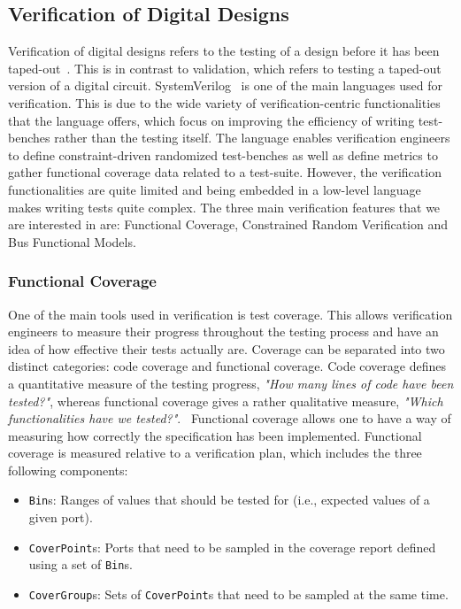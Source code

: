 \documentclass[conference]{IEEEtran}
\begin{document}
\subsection{Verification of Digital Designs}
Verification of digital designs refers to the testing of a design before it has been taped-out~\cite{spear2008systemverilog}. This is in contrast to validation, which refers to testing a taped-out version of a digital circuit. 
SystemVerilog~\cite{SystemVerilog} is one of the main languages used for verification.
This is due to the wide variety of verification-centric functionalities that the language offers, which focus on improving the efficiency of writing test-benches rather than the testing itself.
The language enables verification engineers to define constraint-driven randomized test-benches as well as define metrics to gather functional coverage data related to a test-suite. 
However, the verification functionalities are quite limited and being embedded in a low-level language makes writing tests quite complex. 
The three main verification features that we are interested in are: Functional Coverage, Constrained Random Verification and Bus Functional Models.

\subsubsection{Functional Coverage}
One of the main tools used in verification is test coverage. 
This allows verification engineers to measure their progress throughout the testing process and have an idea of how effective their tests actually are. 
Coverage can be separated into two distinct categories: code coverage and functional coverage. 
Code coverage defines a quantitative measure of the testing progress, \textit{"How many lines of code have been tested?"}, whereas functional coverage gives a rather qualitative measure, \textit{"Which functionalities have we tested?"}.~\cite{spear2008systemverilog}  
Functional coverage allows one to have a way of measuring how correctly the specification has been implemented. Functional coverage is measured relative to a verification plan, which includes the three following components:

\begin{itemize}
  \item \texttt{Bin}s: Ranges of values that should be tested for (i.e., expected values of a given port).
  \item \texttt{CoverPoint}s: Ports that need to be sampled in the coverage report defined using a set of \texttt{Bin}s.
  \item \texttt{CoverGroup}s: Sets of \texttt{CoverPoint}s that need to be sampled at the same time.
\end{itemize}
\end{document}
